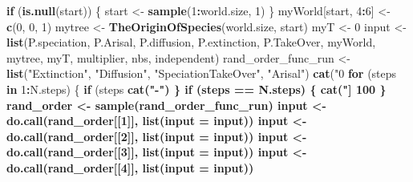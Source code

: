 \documentclass[]{book}
\newenvironment{Shaded}{\begin{snugshade}}{\end{snugshade}}
\newcommand{\KeywordTok}[1]{\textcolor[rgb]{0.13,0.29,0.53}{\textbf{{#1}}}}
\newcommand{\DataTypeTok}[1]{\textcolor[rgb]{0.13,0.29,0.53}{{#1}}}
\newcommand{\DecValTok}[1]{\textcolor[rgb]{0.00,0.00,0.81}{{#1}}}
\newcommand{\CharTok}[1]{\textcolor[rgb]{0.31,0.60,0.02}{{#1}}}
\newcommand{\StringTok}[1]{\textcolor[rgb]{0.31,0.60,0.02}{{#1}}}
\newcommand{\ControlFlowTok}[1]{\textcolor[rgb]{0.13,0.29,0.53}{\textbf{{#1}}}}
\newcommand{\OperatorTok}[1]{\textcolor[rgb]{0.81,0.36,0.00}{\textbf{{#1}}}}
\newcommand{\NormalTok}[1]{{#1}}
\theoremstyle{definition}
\theoremstyle{definition}
\theoremstyle{definition}
\theoremstyle{remark}
\begin{document}
\begin{Shaded}
\begin{Highlighting}[]
    \ControlFlowTok{if}\NormalTok{ (}\KeywordTok{is.null}\NormalTok{(start)) \{}
\NormalTok{        start <-}\StringTok{ }\KeywordTok{sample}\NormalTok{(}\DecValTok{1}\OperatorTok{:}\NormalTok{world.size, }\DecValTok{1}\NormalTok{)}
\NormalTok{    \}}
\NormalTok{    myWorld[start, }\DecValTok{4}\OperatorTok{:}\DecValTok{6}\NormalTok{] <-}\StringTok{ }\KeywordTok{c}\NormalTok{(}\DecValTok{0}\NormalTok{, }\DecValTok{0}\NormalTok{, }\DecValTok{1}\NormalTok{)}
\NormalTok{    mytree <-}\StringTok{ }\KeywordTok{TheOriginOfSpecies}\NormalTok{(world.size, start)}
\NormalTok{    myT <-}\StringTok{ }\DecValTok{0}
\NormalTok{    input <-}\StringTok{ }\KeywordTok{list}\NormalTok{(P.speciation, P.Arisal, P.diffusion, P.extinction, }
\NormalTok{        P.TakeOver, myWorld, mytree, myT, multiplier, nbs, independent)}
\NormalTok{    rand_order_func_run <-}\StringTok{ }\KeywordTok{list}\NormalTok{(}\StringTok{"Extinction"}\NormalTok{, }\StringTok{"Diffusion"}\NormalTok{, }\StringTok{"SpeciationTakeOver"}\NormalTok{, }
        \StringTok{"Arisal"}\NormalTok{)}
    \KeywordTok{cat}\NormalTok{(}\StringTok{"0%
    \ControlFlowTok{for}\NormalTok{ (steps }\ControlFlowTok{in} \DecValTok{1}\OperatorTok{:}\NormalTok{N.steps) \{}
        \ControlFlowTok{if}\NormalTok{ (steps}\OperatorTok{%
            \KeywordTok{cat}\NormalTok{(}\StringTok{"-"}\NormalTok{)}
\NormalTok{        \}}
        \ControlFlowTok{if}\NormalTok{ (steps }\OperatorTok{==}\StringTok{ }\NormalTok{N.steps) \{}
            \KeywordTok{cat}\NormalTok{(}\StringTok{"] 100 %
\NormalTok{        \}}
\NormalTok{        rand_order <-}\StringTok{ }\KeywordTok{sample}\NormalTok{(rand_order_func_run)}
\NormalTok{        input <-}\StringTok{ }\KeywordTok{do.call}\NormalTok{(rand_order[[}\DecValTok{1}\NormalTok{]], }\KeywordTok{list}\NormalTok{(}\DataTypeTok{input =}\NormalTok{ input))}
\NormalTok{        input <-}\StringTok{ }\KeywordTok{do.call}\NormalTok{(rand_order[[}\DecValTok{2}\NormalTok{]], }\KeywordTok{list}\NormalTok{(}\DataTypeTok{input =}\NormalTok{ input))}
\NormalTok{        input <-}\StringTok{ }\KeywordTok{do.call}\NormalTok{(rand_order[[}\DecValTok{3}\NormalTok{]], }\KeywordTok{list}\NormalTok{(}\DataTypeTok{input =}\NormalTok{ input))}
\NormalTok{        input <-}\StringTok{ }\KeywordTok{do.call}\NormalTok{(rand_order[[}\DecValTok{4}\NormalTok{]], }\KeywordTok{list}\NormalTok{(}\DataTypeTok{input =}\NormalTok{ input))}
}}}
\end{Highlighting}
\end{Shaded}
\end{document}
